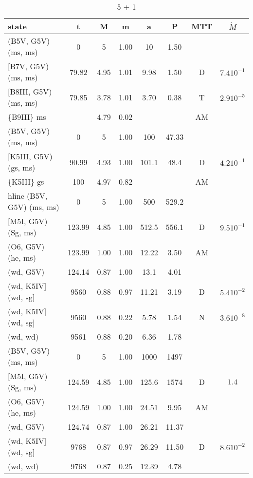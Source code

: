 \documentclass{article}
\begin{document}
\begin{table}
\caption{5 + 1}
\begin{tabular}{p{4cm}ccccccc}
\hline
state 		    	& t 	& M	& m	& a	& P	& MTT	&$\dot{M}$		\\ \hline 
(B5V, G5V) (ms, ms)	& 0	& 5	& 1.00	& 10	& 1.50	&       &			\\
$[$B7V, G5V) (ms, ms)	& 79.82	& 4.95	& 1.01	& 9.98	& 1.50	& D     & $7.4 10^{-1}$		\\ 
$[$B8III, G5V) (ms, ms)	& 79.85	& 3.78	& 1.01	& 3.70	& 0.38	& T     & $2.9 10^{-5}$		\\ 
\{B9III\} ms		&	& 4.79	& 0.02	&	&	& AM	& 			\\
\hline
(B5V, G5V) (ms, ms)	& 0	& 5	& 1.00	& 100	& 47.33	&       &			\\
$[$K5III, G5V) (gs, ms)	& 90.99	& 4.93	& 1.00	& 101.1	& 48.4	& D     & $4.2 10^{-1}$		\\ 
\{K5III\} gs         	& 100  	& 4.97	& 0.82	&     	&     	& AM    &               	\\ 
hline
(B5V, G5V) (ms, ms)	& 0	& 5	& 1.00	& 500	& 529.2	&       &			\\
$[$M5I, G5V) (Sg, ms)	& 123.99& 4.85	& 1.00	& 512.5	& 556.1	& D     & $9.5 10^{-1}$		\\ 
(O6, G5V) (he, ms)	& 123.99& 1.00	& 1.00	& 12.22	& 3.50 	& AM    &               	\\ 
(wd, G5V)         	& 124.14& 0.87	& 1.00	& 13.1 	& 4.01 	&       &               	\\ 
(wd, K5IV$]$ (wd, sg$]$	& 9560  & 0.88	& 0.97	& 11.21	& 3.19 	& D     & $5.4 10^{-2}$		\\ 
(wd, K5IV$]$ (wd, sg$]$	& 9560  & 0.88	& 0.22	& 5.78 	& 1.54 	& N     & $3.6 10^{-8}$		\\ 
(wd, wd)           	& 9561  & 0.88	& 0.20	& 6.36 	& 1.78 	&       &               	\\ 
\hline
(B5V, G5V) (ms, ms)	& 0	& 5	& 1.00	& 1000	& 1497 	&       &			\\
$[$M5I, G5V) (Sg, ms)	& 124.59& 4.85	& 1.00	& 125.6	& 1574 	& D     & $1.4$        		\\ 
(O6, G5V) (he, ms)	& 124.59& 1.00	& 1.00	& 24.51	& 9.95 	& AM    &               	\\ 
(wd, G5V)         	& 124.74& 0.87	& 1.00	& 26.21	& 11.37	&       &               	\\ 
(wd, K5IV$]$ (wd, sg$]$	& 9768  & 0.87	& 0.97	& 26.29	& 11.50	& D     & $8.6 10^{-2}$		\\ 
(wd, wd)        	& 9768  & 0.87	& 0.25	& 12.39	& 4.78 	&       &               	\\ 
\hline
\end{tabular}
\end{table}
\end{document}
